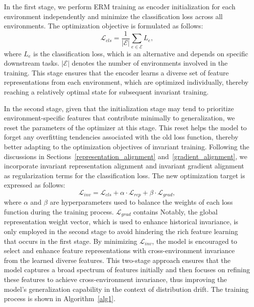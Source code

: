 In the first stage, we perform ERM training as encoder initialization for each environment independently and minimize the classification loss across all environments. The optimization objective is formulated as follows:
\begin{equation}
\label{l_cls}
\mathcal{L}_{cls} = \frac{1}{|\mathcal{E}|} \sum_{e \in \mathcal{E}} L_{e},
\end{equation}
where $L_{e}$ is the classification loss, which is an alternative and depends on specific downstream tasks. $|\mathcal{E}|$ denotes the number of environments involved in the training. This stage ensures that the encoder learns a diverse set of feature representations from each environment, which are optimized individually, thereby reaching a relatively optimal state for subsequent invariant training.




In the second stage, given that the initialization stage may tend to prioritize environment-specific features that contribute minimally to generalization, we reset the parameters of the optimizer at this stage. This reset helps the model to forget any overfitting tendencies associated with the old loss function, thereby better adapting to the optimization objectives of invariant training. Following the discussions in Sections~\ref{representation_alignment} and~\ref{gradient_alignment}, we incorporate invariant representation alignment and invariant gradient alignment as regularization terms for the classification loss. The new optimization target is expressed as follows:
\begin{equation}
\mathcal{L}_{inv} = \mathcal{L}_{cls} + \alpha \cdot \mathcal{L}_{rep} + \beta \cdot \mathcal{L}_{grad},
\end{equation}
where $\alpha$ and $\beta$ are hyperparameters used to balance the weights of each loss function during the training process. $\mathcal{L}_{grad}$ contains  Notably, the global representation weight vector, which is used to enhance historical invariance, is only employed in the second stage to avoid hindering the rich feature learning that occurs in the first stage. By minimizing $\mathcal{L}_{inv}$, the model is encouraged to select and enhance feature representations with cross-environment invariance from the learned diverse features. This two-stage approach ensures that the model captures a broad spectrum of features initially and then focuses on refining these features to achieve cross-environment invariance, thus improving the model's generalization capability in the context of distribution drift. The training process is shown in Algorithm~\ref{alg1}.


